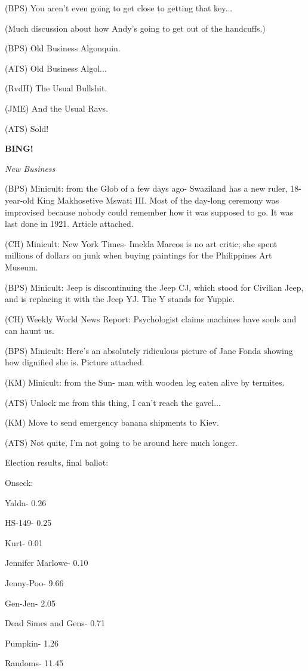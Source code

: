 \documentclass[12pt]{article}
\newcommand{\bing}{{\bf BING!} }
\newcommand{\goto}[1]{\bing \vskip 12pt \centerline{{\em{#1}}}}
\begin{document}
(BPS) You aren't even going to get close to getting that key...

(Much discussion about how Andy's going to get out of the handcuffs.)

(BPS) Old Business Algonquin.

(ATS) Old Business Algol...

(RvdH) The Usual Bullshit.

(JME) And the Usual Ravs.

(ATS) Sold!

\goto{New Business}

(BPS) Minicult: from the Glob of a few days ago- Swaziland has a new ruler, 18-year-old King Makhosetive Mswati III. Most of the day-long ceremony was improvised because nobody could remember how it was supposed to go. It was last done in 1921. Article attached.

(CH) Minicult: New York Times- Imelda Marcos is no art critic; she spent millions of dollars on junk when buying paintings for the Philippines Art Museum.

(BPS) Minicult: Jeep is discontinuing the Jeep CJ, which stood for Civilian Jeep, and is replacing it with the Jeep YJ. The Y stands for Yuppie.

(CH) Weekly World News Report: Psychologist claims machines have souls and can haunt us.

(BPS) Minicult: Here's an absolutely ridiculous picture of Jane Fonda showing how dignified she is. Picture attached.

(KM) Minicult: from the Sun- man with wooden leg eaten alive by termites.

(ATS) Unlock me from this thing, I can't reach the gavel...

(KM) Move to send emergency banana shipments to Kiev.

(ATS) Not quite, I'm not going to be around here much longer.

Election results, final ballot:

Onseck:

Yalda- 0.26

HS-149- 0.25

Kurt- 0.01

Jennifer Marlowe- 0.10

Jenny-Poo- 9.66

Gen-Jen- 2.05

Dead Simes and Gens- 0.71

Pumpkin- 1.26

Randoms- 11.45
\end{document}
